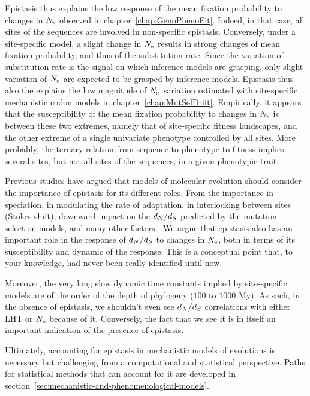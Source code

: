 Epistasis thus explains the low response of the mean fixation probability to changes in $N_{\textrm{e}}$ observed in chapter~\ref{chap:GenoPhenoFit}.
Indeed, in that case, all sites of the sequences are involved in non-specific epistasis.
Conversely, under a site-specific model, a slight change in $N_{\textrm{e}}$ results in strong changes of mean fixation probability, and thus of the substitution rate.
Since the variation of substitution rate is the signal on which inference models are grasping, only slight variation of $N_{\textrm{e}}$ are expected to be grasped by inference models.
Epistasis thus also the explains the low magnitude of $N_{\textrm{e}}$ variation estimated with site-specific mechanistic codon models in chapter~\ref{chap:MutSelDrift}.
Empirically, it appears that the susceptibility of the mean fixation probability to changes in $N_{\textrm{e}}$ is between these two extremes, namely that of site-specific fitness landscapes, and the other extreme of a single univariate phenotype controlled by all sites.
More probably, the ternary relation from sequence to phenotype to fitness implies several sites, but not all sites of the sequences, in a given phenotypic trait.

Previous studies have argued that models of molecular evolution should consider the importance of epistasis for its different roles.
From the importance in speciation, in modulating the rate of adaptation, in interlocking between sites (Stokes shift), downward impact on the $d_N / d_S$ predicted by the mutation-selection models, and many other factors \citet{Goldstein2017, Miller2018}.
We argue that epistasis also has an important role in the response of $d_N / d_S$ to changes in $N_{\textrm{e}}$, both in terms of its susceptibility and dynamic of the response.
This is a conceptual point that, to your knowledge, had never been really identified until now.

Moreover, the very long slow dynamic time constants implied by site-specific models are of the order of the depth of phylogeny ($100$ to $1000$ My).
As such, in the absence of epistasis, we shouldn't even see $d_N / d_S$ correlations with either LHT or $N_{\textrm{e}}$ because of it.
Conversely, the fact that we see it is in itself an important indication of the presence of epistasis.

Ultimately, accounting for epistasis in mechanistic models of evolutions is necessary but challenging from a computational and statistical perspective.
Paths for statistical methods that can account for it are developed in section~\ref{sec:mechanistic-and-phenomenological-models}.


